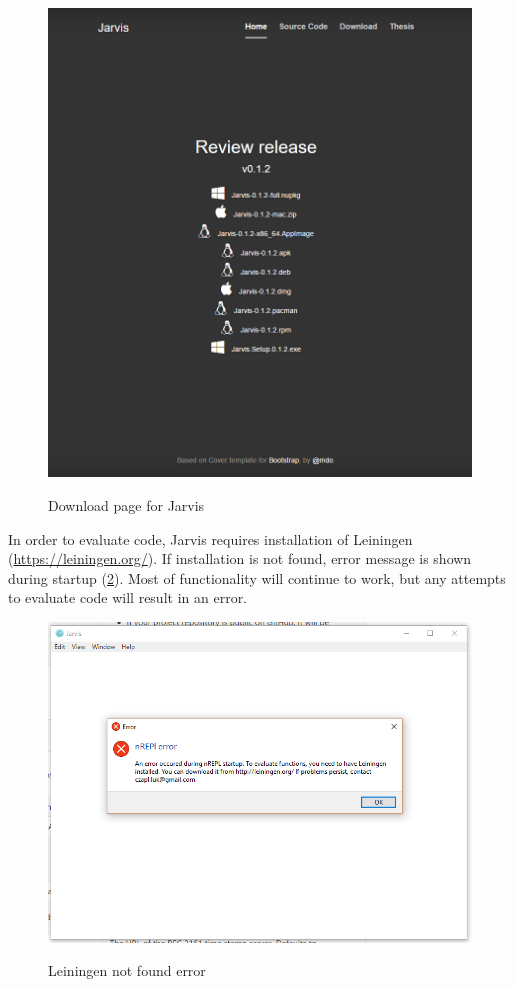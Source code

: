 \documentclass[11pt]{scrartcl}
\begin{document}
\begin{figure}[hbt]
  \includegraphics[scale=0.3]{img/j-inst}
  \label{j-inst} 
  \caption{Download page for Jarvis}
\end{figure}

In order to evaluate code, Jarvis requires installation of Leiningen
(\url{https://leiningen.org/}).
If installation is not found, error message is shown during startup
(\ref{j-error}). Most of functionality will continue to work, but any attempts
to evaluate code will result in an error.

\begin{figure}[hbt]
  \includegraphics[scale=0.3]{img/j-error}
  \label{j-error}
  \caption{Leiningen not found error}
\end{figure}
\end{document}
